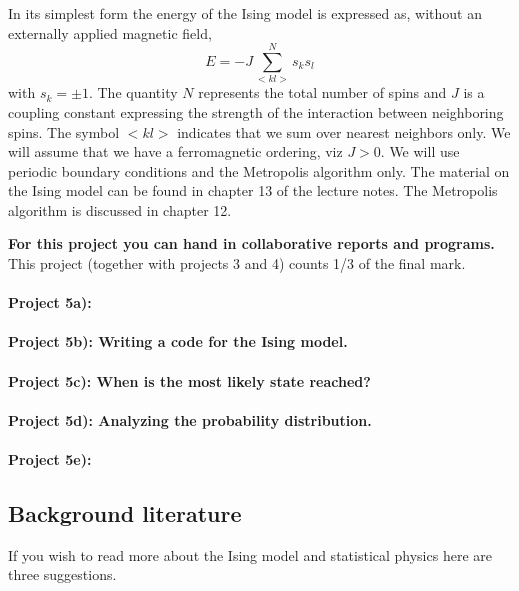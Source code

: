 \documentclass[%
oneside,                 %
final,                   %
10pt]{article}
\begin{document}
In its simplest form
the energy of the Ising model is expressed as, without an externally applied magnetic field, 
\[
E=-J\sum_{< kl >}^{N}s_ks_l 
\]
with
$s_k=\pm 1$. The quantity $N$ represents the total number of spins and $J$ is a coupling
constant expressing the strength of the interaction between
neighboring spins.  The symbol $<kl>$ indicates that we sum over
nearest neighbors only. We will assume that we have a ferromagnetic
ordering, viz $J> 0$.  We will use periodic boundary conditions and
the Metropolis algorithm only. The material on the Ising model can be found in chapter 13 of the lecture notes. The Metropolis algorithm is discussed in chapter 12. 

\textbf{For this project you can hand in collaborative reports and programs.}
This project (together with projects 3 and 4) counts 1/3 of the final mark.

\paragraph{Project 5a):}
\paragraph{Project 5b): Writing a code for the Ising model.}
\paragraph{Project 5c): When is the most likely state reached?}
\paragraph{Project 5d): Analyzing the probability distribution.}
\paragraph{Project 5e):}
\subsection{Background literature}

If you wish to read more about the Ising model and statistical physics here are three suggestions.
\end{document}

